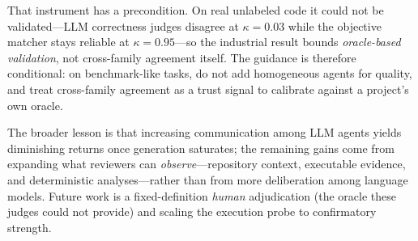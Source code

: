 \documentclass[conference]{IEEEtran}
\begin{document}
That instrument has a precondition. On real unlabeled code it could not be
validated---LLM correctness judges disagree at $\kappa{=}0.03$ while the objective
matcher stays reliable at $\kappa{=}0.95$---so the industrial result bounds
\emph{oracle-based validation}, not cross-family agreement itself. The guidance is
therefore conditional: on benchmark-like tasks, do not add homogeneous agents for
quality, and treat cross-family agreement as a trust signal to calibrate against a
project's own oracle.

The broader lesson is that increasing communication among LLM agents yields
diminishing returns once generation saturates; the remaining gains come from
expanding what reviewers can \emph{observe}---repository context, executable
evidence, and deterministic analyses---rather than from more deliberation among
language models. Future work is a fixed-definition \emph{human} adjudication (the
oracle these judges could not provide) and scaling the execution probe to
confirmatory strength.
\end{document}
